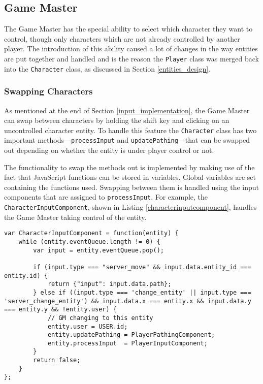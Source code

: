 \subsection{Game Master}
The Game Master has the special ability to select which character they want to control, though only characters which are not already controlled by another player. The introduction of this ability caused a lot of changes in the way entities are put together and handled and is the reason the \texttt{Player} class was merged back into the \texttt{Character} class, as discussed in Section \ref{entities_design}.

\subsubsection{Swapping Characters}
As mentioned at the end of Section \ref{input_implementation}, the Game Master can swap between characters by holding the shift key and clicking on an uncontrolled character entity. To handle this feature the \texttt{Character} class has two important methods---\texttt{processInput} and \texttt{updatePathing}---that can be swapped out depending on whether the entity is under player control or not.

The functionality to swap the methods out is implemented by making use of the fact that JavaScript functions can be stored in variables. Global variables are set containing the functions used. Swapping between them is handled using the input components that are assigned to \texttt{processInput}. For example, the \texttt{CharacterInputComponent}, shown in Listing \ref{characterinputcomponent}, handles the Game Master taking control of the entity.

\noindent
\begin{minipage}{\linewidth}
\begin{lstlisting}[style=js, caption={Input component for handling server input applied to non-player-controlled characters.}, label=characterinputcomponent]
var CharacterInputComponent = function(entity) {
    while (entity.eventQueue.length != 0) {
        var input = entity.eventQueue.pop();

        if (input.type === "server_move" && input.data.entity_id === entity.id) {
            return {"input": input.data.path};
        } else if ((input.type === 'change_entity' || input.type === 'server_change_entity') && input.data.x === entity.x && input.data.y === entity.y && !entity.user) {
            // GM changing to this entity
            entity.user = USER.id;
            entity.updatePathing = PlayerPathingComponent;
            entity.processInput  = PlayerInputComponent;
        }
        return false;
    }
};
\end{lstlisting}
\end{minipage}

